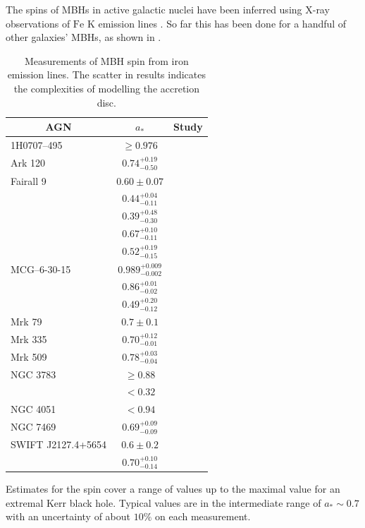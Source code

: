 The spins of MBHs in active galactic nuclei have been inferred using X-ray observations of $\mathrm{Fe}$ $\mathrm{K}$ emission lines \citep{Miller2007, McClintock2011}. So far this has been done for a handful of other galaxies' MBHs, as shown in .
\begin{table}[htp]
\centering
\begin{tabular}{lc l }
\toprule
\multicolumn{1}{c}{AGN} & \multicolumn{1}{c}{$a_\ast$} & \multicolumn{1}{c}{Study} \\ \midrule 
1H0707--495 & $\geq 0.976$ & \citet{Zoghbi2010} \\
Ark 120 & $0.74^{+0.19}_{-0.50}$ & \citet{Nardini2011} \\ %
Fairall 9 & $0.60 \pm 0.07$ & \citet{Schmoll2009} \\
 & $0.44^{+0.04}_{-0.11}$ & \citet{Patrick2011} \\
 & $0.39^{+0.48}_{-0.30}$ & \citet{Emmanoulopoulos2011} \\
 & $0.67^{+0.10}_{-0.11}$ & \citet{Patrick2011a} \\
 & $0.52^{+0.19}_{-0.15}$ & \citet{Lohfink2012} \\
MCG--6-30-15 & $0.989^{+0.009}_{-0.002}$ & \citet{Brenneman2006} \\
 & $0.86^{+0.01}_{-0.02}$ & \citet{delaCallePerez2010} \\
 & $0.49^{+0.20}_{-0.12}$ & \citet{Patrick2011a} \\
Mrk 79 & $0.7 \pm 0.1$ & \citet{Gallo2011} \\
Mrk 335 & $0.70^{+0.12}_{-0.01}$ & \citet{Patrick2011} \\
Mrk 509 & $0.78^{+0.03}_{-0.04}$ & \citet{delaCallePerez2010} \\
NGC 3783 & $\geq 0.88$ & \citet{Brenneman2011} \\
 & $< 0.32$ & \citet{Patrick2011a} \\
NGC 4051 & $< 0.94$ & \citet{Patrick2011a} \\
NGC 7469 & $0.69^{+0.09}_{-0.09}$ & \citet{Patrick2011} \\
SWIFT J2127.4+5654 & $0.6 \pm 0.2$ & \citet{Miniutti2009} \\
 & $0.70^{+0.10}_{-0.14}$ & \citet{Patrick2011} \\
 \bottomrule
\end{tabular}
\caption{Measurements of MBH spin from iron emission lines. The scatter in results indicates the complexities of modelling the accretion disc.\label{tab:X-ray}}
\end{table}
Estimates for the spin cover a range of values up to the maximal value for an extremal Kerr black hole. Typical values are in the intermediate range of $a_\ast \sim 0.7$ with an uncertainty of about $10\%$ on each measurement.

